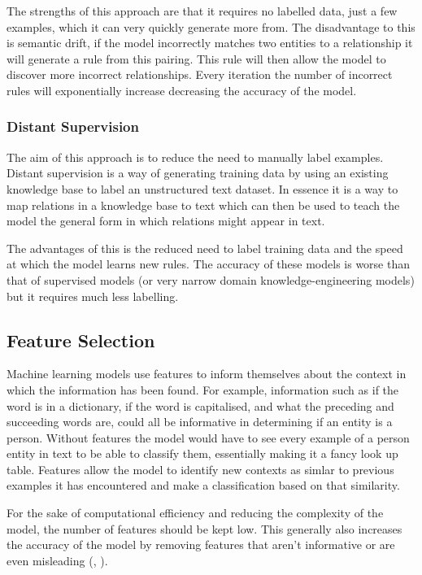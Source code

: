 \documentclass[11pt,oneside]{book}
\begin{document}
The strengths of this approach are that it requires no labelled data, just a few examples, which it can very quickly generate more from. The disadvantage to this is semantic drift, if the model incorrectly matches two entities to a relationship it will generate a rule from this pairing. This rule will then allow the model to discover more incorrect relationships. Every iteration the number of incorrect rules will exponentially increase decreasing the accuracy of the model.

\subsubsection{Distant Supervision}

The aim of this approach is to reduce the need to manually label examples. Distant supervision is a way of generating training data by using an existing knowledge base to label an unstructured text dataset. In essence it is a way to map relations in a knowledge base to text which can then be used to teach the model the general form in which relations might appear in text.

The advantages of this is the reduced need to label training data and the speed at which the model learns new rules. The accuracy of these models is worse than that of supervised models (or very narrow domain knowledge-engineering models) but it requires much less labelling.

\subsection{Feature Selection}

Machine learning models use features to inform themselves about the context in which the information has been found. For example, information such as if the word is in a dictionary, if the word is capitalised, and what the preceding and succeeding words are, could all be informative in determining if an entity is a person. Without features the model would have to see every example of a person entity in text to be able to classify them, essentially making it a fancy look up table. Features allow the model to identify new contexts as simlar to previous examples it has encountered and make a classification based on that similarity.

For the sake of computational efficiency and reducing the complexity of the model, the number of features should be kept low. This generally also increases the accuracy of the model by removing features that aren't informative or are even misleading (\citet{feature_selection}, \citet{less_features_good}).
\end{document}
